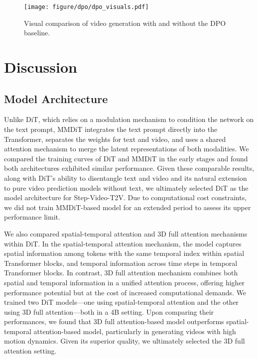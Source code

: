 \begin{figure*}[ht]
    \centering
    \texttt{[image: figure/dpo/dpo\_visuals.pdf]}
    \caption{Visual comparison of video generation with and without the DPO baseline.}
    \label{fig:dpovisual}
\end{figure*}


\section{Discussion}
\subsection{Model Architecture}
Unlike DiT, which relies on a modulation mechanism to condition the network on the text prompt, MMDiT integrates the text prompt directly into the Transformer, separates the weights for text and video, and uses a shared attention mechanism to merge the latent representations of both modalities. We compared the training curves of DiT and MMDiT in the early stages and found both architectures exhibited similar performance. Given these comparable results, along with DiT's ability to disentangle text and video and its natural extension to pure video prediction models without text, we ultimately selected DiT as the model architecture for Step-Video-T2V. Due to computational cost constraints, we did not train MMDiT-based model for an extended period to assess its upper performance limit.

We also compared spatial-temporal attention and 3D full attention mechanisms within DiT. In the spatial-temporal attention mechanism, the model captures spatial information among tokens with the same temporal index within spatial Transformer blocks, and temporal information across time steps in temporal Transformer blocks. In contrast, 3D full attention mechanism combines both spatial and temporal information in a unified attention process, offering higher performance potential but at the cost of increased computational demands. We trained two DiT models—one using spatial-temporal attention and the other using 3D full attention—both in a 4B setting. Upon comparing their performances, we found that 3D full attention-based model outperforms spatial-temporal attention-based model, particularly in generating videos with high motion dynamics. Given its superior quality, we ultimately selected the 3D full attention setting.

